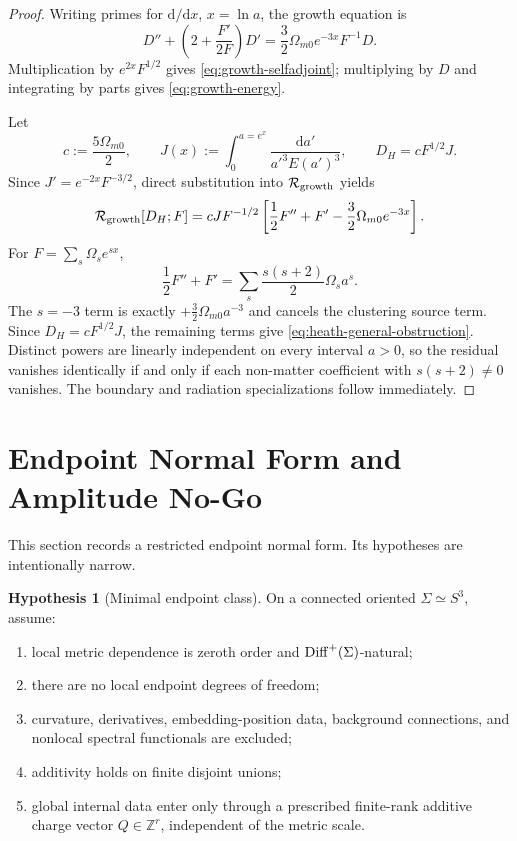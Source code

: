\documentclass[aps,prd,preprint,onecolumn,nofootinbib,superscriptaddress,showkeys]{revtex4-2}
\numberwithin{equation}{section}
\theoremstyle{definition}
\newtheorem{hypothesis}{Hypothesis}[section]
\theoremstyle{plain}
\newcommand{\Sthree}{S^3}
\newcommand{\dd}{\mathrm d}
\begin{document}
\begin{proof}
Writing primes for \(\dd/\dd x\), \(x=\ln a\), the growth equation is
\[
D''+\left(2+\frac{F'}{2F}\right)D'
=
\frac32\Omega_{m0}e^{-3x}F^{-1}D.
\]
Multiplication by \(e^{2x}F^{1/2}\) gives \cref{eq:growth-selfadjoint}; multiplying by \(D\) and integrating by parts gives \cref{eq:growth-energy}.

Let
\[
c:=\frac{5\Omega_{m0}}{2},
\qquad
J(x):=\int_0^{a=e^x}\frac{\dd a'}{a'^3E(a')^3},
\qquad
D_H=cF^{1/2}J.
\]
Since \(J'=e^{-2x}F^{-3/2}\), direct substitution into \(\mathcal R_{\rm growth}\) yields
\[
\mathcal R_{\rm growth}[D_H;F]
=
cJF^{-1/2}
\left[
\frac12F''+F'-\frac32\Omega_{m0}e^{-3x}
\right].
\]
For \(F=\sum_s\Omega_se^{sx}\),
\[
\frac12F''+F'
=
\sum_s\frac{s(s+2)}{2}\Omega_sa^s.
\]
The \(s=-3\) term is exactly \(+\tfrac32\Omega_{m0}a^{-3}\) and cancels the clustering source term.  Since \(D_H=cF^{1/2}J\), the remaining terms give \cref{eq:heath-general-obstruction}.  Distinct powers are linearly independent on every interval \(a>0\), so the residual vanishes identically if and only if each non-matter coefficient with \(s(s+2)\ne0\) vanishes.  The boundary and radiation specializations follow immediately.
\end{proof}

\section{Endpoint Normal Form and Amplitude No-Go}

This section records a restricted endpoint normal form.  Its hypotheses are intentionally narrow.

\begin{hypothesis}[Minimal endpoint class]
On a connected oriented \(\Sigma\simeq\Sthree\), assume:
\begin{enumerate}
\item local metric dependence is zeroth order and \({\rm Diff}^+(\Sigma)\)-natural;
\item there are no local endpoint degrees of freedom;
\item curvature, derivatives, embedding-position data, background connections, and nonlocal spectral functionals are excluded;
\item additivity holds on finite disjoint unions;
\item global internal data enter only through a prescribed finite-rank additive charge vector \(Q\in\mathbb Z^r\), independent of the metric scale.
\end{enumerate}
\end{hypothesis}
\end{document}
